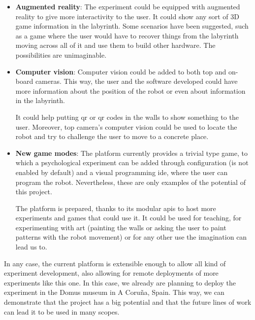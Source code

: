 \begin{itemize}

\item \textbf{Augmented reality}: The experiment could be equipped with augmented reality to give
more interactivity to the user. It could show any sort of 3D game information in the labyrinth. Some
scenarios have been suggested, such as a game where the user would have to recover things from the
labyrinth moving across all of it and use them to build other hardware. The possibilities are
unimaginable.

\item \textbf{Computer vision}: Computer vision could be added to both top and on-board cameras.
This way, the user and the software developed could have more information about the position of the
robot or even about information in the labyrinth.

It could help putting \acrshort{qr} or
\acrlong{qr} codes in the walls to show something to the user. Moreover, top camera's computer
vision could be used to locate the robot and try to challenge the user to move to a concrete place.

\item \textbf{New game modes}: The platform currently provides a trivial type game, to which a
psychological experiment can be added through configuration (is not enabled by default) and a visual
programming \acrshort{ide}, where the user can program the robot. Nevertheless, these are only
examples of the potential of this project.

The platform is prepared, thanks to its modular \acrshort{api}s to host more experiments and games
that could use it. It could be used for teaching, for experimenting with art (painting the walls or
asking the user to paint patterns with the robot movement) or for any other use the imagination can
lead us to.

\end{itemize}

In any case, the current platform is extensible enough to allow all kind of experiment development,
also allowing for remote deployments of more experiments like this one. In this case, we already
are planning to deploy the experiment in the Domus museum in A Coruña, Spain. This way, we can
demonstrate that the project has a big potential and that the future lines of work can lead it to
be used in many scopes.
